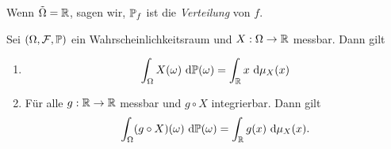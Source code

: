 \documentclass[language=ngerman]{../../Template/TemplateLecture}
\begin{document}
Wenn $\tilde{\Omega} = \mathbb{R}$, sagen wir, $\mathbb{P}_f$ ist die \emph{Verteilung} von $f$.

\begin{lem}{}{}
    Sei $(\Omega,\mathcal{F},\mathbb{P})$ ein Wahrscheinlichkeitsraum und $X: \Omega \to \mathbb{R}$ messbar. Dann gilt
    \begin{enumerate}[$(i)$]
        \item     \begin{equation}
            \int_\Omega X(\omega) ~\mathrm{d}\mathbb{P}(\omega) = \int_{\mathbb{R}} x ~\mathrm{d}\mu_X(x)\label{eq:measureCreator1}
        \end{equation}
        \item Für alle $g: \mathbb{R} \to \mathbb{R}$ messbar und $g \circ X$ integrierbar. Dann gilt 
        \begin{equation}
            \int_\Omega (g \circ X) (\omega) ~\mathrm{d}\mathbb{P}(\omega) = \int_{\mathbb{R}} g(x) ~\mathrm{d}\mu_X(x).\label{eq:measureCreator2}
        \end{equation}
    \end{enumerate} 
\end{lem}
\end{document}
